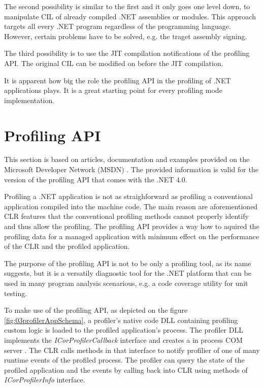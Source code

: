 The second possibility is similar to the first and it only goes one level down, to manipulate CIL of already compiled .NET assemblies or modules. This approach targets all every .NET program regardless of the programming language. However, certain problems have to be solved, e.g. the traget assembly signing.

The third possibility is to use the JIT compilation notifications of the profiling API. The original CIL can be modified on before the JIT compilation.

It is apparent how big the role the profiling API in the profiling of .NET applications plays. It is a great starting point for every profiling mode implementation.

\section{Profiling API}
This section is based on articles, documentation and examples provided on the Microsoft Developer Network (MSDN) \cite{ProfMSDN}. The provided information is valid for the version of the profiling API that comes with the .NET 4.0. 

Profiling a .NET application is not as straighforward as profiling a conventional application compiled into the machine code. The main reason are aforementioned CLR features that the conventional profiling methods cannot properly identify and thus allow the profiling. The profiling API provides a way how to aquired the profiling data for a managed application with minimum effect on the performance of the CLR and the profiled application. 

The purporse of the profiling API is not to be only a profiling tool, as its name suggests, but it is a versatily diagnostic tool for the .NET platform that can be used in many program analysis scenarious, e.g. a code coverage utility for unit testing.

To make use of the profiling API, as depicted on the figure \ref{fig:03profilerAppSchema}, a profiler's native code DLL containing profiling custom logic is loaded to the profiled application's process. The profiler DLL implements the \textit{ICorProfilerCallback} interface and creates a in process COM server . The CLR calls methods in that interface to notify profilier of one of many runtime events of the profiled process. The profiler can query the state of the profiled application and the events by calling back into CLR using methods of \textit{ICorProfilerInfo} interface.

